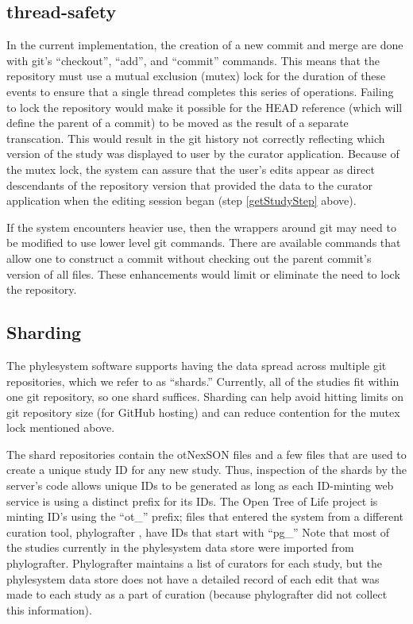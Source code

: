\documentclass{bioinfo}
\newcommand{\ps}{phylesystem\xspace}
\newcommand{\otol}{Open Tree of Life\xspace}
\newcommand{\nexson}{otNexSON\xspace}
\begin{document}
\begin{methods}
\subsection*{thread-safety}
In the current implementation, the creation of a new commit and merge are done with git's ``checkout'', ``add'', and ``commit'' commands.
This means that the repository must use a mutual exclusion (mutex) lock for the duration of these events
    to ensure that a single thread completes this series of operations.
Failing to lock the repository would make it possible for the HEAD reference (which
    will define the parent of a commit) to be moved as the result of a separate transcation.
This would result in the git history not correctly reflecting which version of the 
    study was displayed to user by the curator application.
Because of the mutex lock, the system can assure that the user's edits appear
    as direct descendants of the repository version that provided the data to 
    the curator application when the editing session began (step \ref{getStudyStep} above).

If the system encounters heavier use, then the wrappers around git may need to 
    be modified to use lower level git commands.
There are available commands that allow one to construct a commit without checking out
    the parent commit's version of all files.
These enhancements would limit or eliminate the need to lock the repository.
\subsection*{Sharding}
The \ps software supports having the data spread across multiple git repositories, which
    we refer to as ``shards.''
Currently, all of the studies fit within one git repository, so one shard suffices.
Sharding can help avoid hitting limits on git repository size (for GitHub hosting) and can 
    reduce contention for the mutex lock mentioned above.

The shard repositories contain the \nexson files and a few files that are used to 
    create a unique study ID for any new study.
Thus, inspection of the shards by the server's code allows unique IDs to be generated as long as 
    each ID-minting web service is using a distinct prefix for its IDs.
The \otol project is minting ID's using the ``ot\_'' prefix;
    files that entered the system from a different curation tool, phylografter \citep{Phylografter},
    have IDs that start with ``pg\_''
Note that most of the studies currently in the \ps data store were imported from phylografter.
Phylografter maintains a list of curators for each study, but the \ps data store does not
    have a detailed record of each edit that was made to each study as a part of 
    curation (because phylografter did not collect this information).


\end{methods}
\end{document}
